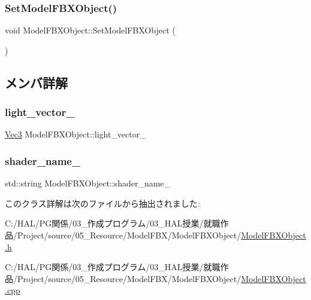\subsubsection{\texorpdfstring{Set\+Model\+F\+B\+X\+Object()}{SetModelFBXObject()}}
{\footnotesize\ttfamily void Model\+F\+B\+X\+Object\+::\+Set\+Model\+F\+B\+X\+Object (\begin{DoxyParamCaption}{ }\end{DoxyParamCaption})}



\subsection{メンバ詳解}
\mbox{\label{class_model_f_b_x_object_a9d7b849ac816b7e5841d54a4b75216a9}} 
\subsubsection{\texorpdfstring{light\+\_\+vector\+\_\+}{light\_vector\_}}
{\footnotesize\ttfamily \mbox{\hyperlink{_vector3_d_8h_ab16f59e4393f29a01ec8b9bbbabbe65d}{Vec3}} Model\+F\+B\+X\+Object\+::light\+\_\+vector\+\_\+}

\mbox{\label{class_model_f_b_x_object_a9a1728e6b2d5f1a49b26c1aaf75049f0}} 
\subsubsection{\texorpdfstring{shader\+\_\+name\+\_\+}{shader\_name\_}}
{\footnotesize\ttfamily std\+::string Model\+F\+B\+X\+Object\+::shader\+\_\+name\+\_\+}



このクラス詳解は次のファイルから抽出されました\+:\begin{DoxyCompactItemize}
\item 
C\+:/\+H\+A\+L/\+P\+G関係/03\+\_\+作成プログラム/03\+\_\+\+H\+A\+L授業/就職作品/\+Project/source/05\+\_\+\+Resource/\+Model\+F\+B\+X/\+Model\+F\+B\+X\+Object/\mbox{\hyperlink{_model_f_b_x_object_8h}{Model\+F\+B\+X\+Object.\+h}}\item 
C\+:/\+H\+A\+L/\+P\+G関係/03\+\_\+作成プログラム/03\+\_\+\+H\+A\+L授業/就職作品/\+Project/source/05\+\_\+\+Resource/\+Model\+F\+B\+X/\+Model\+F\+B\+X\+Object/\mbox{\hyperlink{_model_f_b_x_object_8cpp}{Model\+F\+B\+X\+Object.\+cpp}}\end{DoxyCompactItemize}
